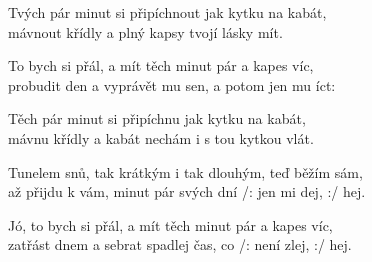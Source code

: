 
Tvých pár minut si připíchnout jak kytku na kabát,\\
mávnout křídly a plný kapsy tvojí lásky mít.  

\ve{}
To bych si přál, a mít těch minut pár a kapes víc,\\
probudit den a vyprávět mu sen, a potom jen mu íct: 

Těch pár minut si připíchnu jak kytku na kabát,\\
mávnu křídly a kabát nechám i s tou kytkou vlát.

\ve{}
Tunelem snů, tak krátkým i tak dlouhým, teď běžím sám,\\
až přijdu k vám, minut pár svých dní /: jen mi dej, :/ hej. 


\ve{}
Jó, to bych si přál, a mít těch minut pár a kapes víc,\\
zatřást dnem a sebrat spadlej čas, co /: není zlej, :/ hej. 


\esong{}